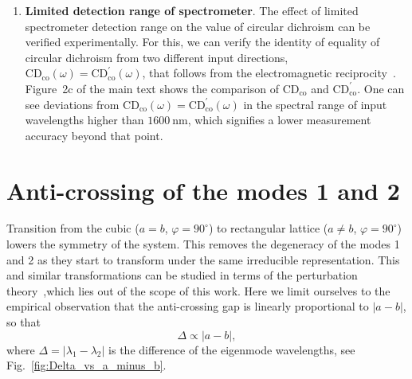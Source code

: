 \documentclass[
    reprint,
    superscriptaddress,
    a4paper,
    amsmath,amssymb,
    prb,
]{revtex4-2}
\begin{document}
\begin{enumerate}
	We note that for the increase of the nonlinear signal value, it is favorable to achieve the so-called critical (optimal) coupling regime, when $Q_{\text{ideal}} \approx Q_{\text{imp}}$~\cite{Hermann1984, Maier2006OE,seok2011radiation}. In this case, the local electric field inside the metasurface material reaches its maximal value, which increases generated nonlinear currents, and, consequently, the emitted harmonic signal~\cite{koshelev2019nonlinear}, that we can collect in the far-field.
	
	\item \textbf{Limited detection range of spectrometer}. The effect of limited spectrometer detection range on the value of circular dichroism can be verified experimentally. For this, we can verify the identity of equality of circular dichroism from two different input directions, $\mathrm{CD}_{\text{co}}(\omega) = \mathrm{CD}^{\prime}_{\text{co}}(\omega)$, that follows from the electromagnetic reciprocity~\cite[Ch.~9]{Shalin2024AllDielectricNanophotonics}. Figure~2c of the main text shows the comparison of $\mathrm{CD}_{\text{co}}$ and $\mathrm{CD}^{\prime}_{\text{co}}$. One can see deviations from  $\mathrm{CD}_{\text{co}}(\omega) = \mathrm{CD}^{\prime}_{\text{co}}(\omega)$ in the spectral range of input wavelengths higher than $1600~\text{nm}$, which signifies a lower measurement accuracy beyond that point.
	
\end{enumerate}




\section{Anti-crossing of the modes 1 and 2}

Transition from the cubic ($a = b$, $\varphi = 90^{\circ}$) to rectangular lattice ($a \neq b$, $\varphi = 90^{\circ}$) lowers the symmetry of the system. This removes the degeneracy of the modes 1 and 2 as they start to transform under the same irreducible representation. This and similar transformations can be studied in terms of the perturbation theory~\cite{Igoshin2024PRB,Muljarov2018OL,CanosValero2024PhysRevRes},which lies out of the scope of this work. Here we limit ourselves to the empirical observation that the anti-crossing gap is linearly proportional to $|a - b|$, so that
\begin{equation}
	\Delta \propto |a - b|,
\end{equation}
where $\Delta = |\lambda_1 - \lambda_2|$ is the difference of the eigenmode wavelengths, see Fig.~\ref{fig:Delta_vs_a_minus_b}.
\end{document}
